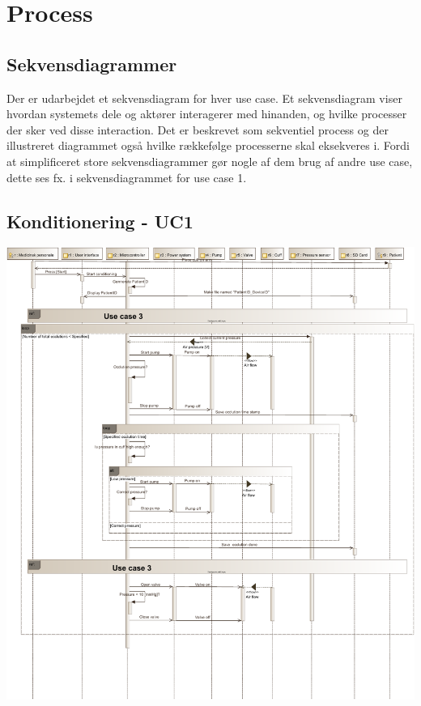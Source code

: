 \section{Process}

\subsection{Sekvensdiagrammer}
Der er udarbejdet et sekvensdiagram for hver use case. Et sekvensdiagram viser hvordan systemets dele og aktører interagerer med hinanden, og hvilke processer der sker ved disse interaction. Det er beskrevet som sekventiel process og der illustreret diagrammet også hvilke rækkefølge processerne skal eksekveres i. 
Fordi at simplificeret store sekvensdiagrammer gør nogle af dem brug af andre use case, dette ses fx. i sekvensdiagrammet for use case 1. 

\subsection{Konditionering - UC1}
\includegraphics[width=\textwidth]{pdfs/SD_UC1-crop.pdf}

